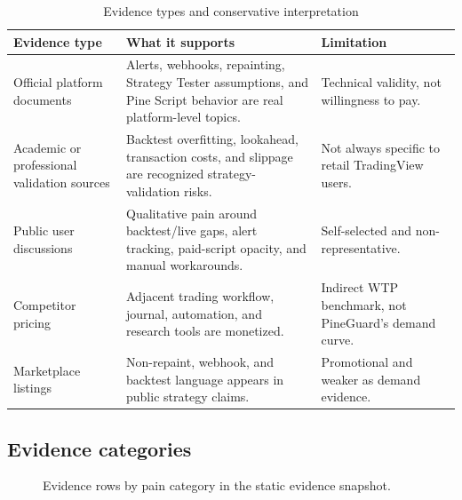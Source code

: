 \documentclass[11pt,a4paper]{article}
\begin{document}
\begin{table}[H]
\centering
\caption{Evidence types and conservative interpretation}
\small
\begin{tabularx}{\textwidth}{>{\raggedright\arraybackslash}p{3.2cm}X>{\raggedright\arraybackslash}p{3.0cm}}
\toprule
\textbf{Evidence type} & \textbf{What it supports} & \textbf{Limitation} \\
\midrule
Official platform documents & Alerts, webhooks, repainting, Strategy Tester assumptions, and Pine Script behavior are real platform-level topics. & Technical validity, not willingness to pay. \\
Academic or professional validation sources & Backtest overfitting, lookahead, transaction costs, and slippage are recognized strategy-validation risks. & Not always specific to retail TradingView users. \\
Public user discussions & Qualitative pain around backtest/live gaps, alert tracking, paid-script opacity, and manual workarounds. & Self-selected and non-representative. \\
Competitor pricing & Adjacent trading workflow, journal, automation, and research tools are monetized. & Indirect WTP benchmark, not PineGuard's demand curve. \\
Marketplace listings & Non-repaint, webhook, and backtest language appears in public strategy claims. & Promotional and weaker as demand evidence. \\
\bottomrule
\end{tabularx}
\end{table}

\subsection{Evidence categories}

\begin{figure}[H]
\centering
{}
\caption{Evidence rows by pain category in the static evidence snapshot.}
\end{figure}
\end{document}
